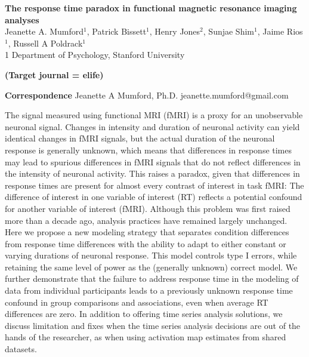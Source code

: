 \documentclass[titlepage,12pt] {article}
\begin{document}
\begin{titlepage}
\begin{center}
{\large\textbf{The response time paradox in functional magnetic resonance imaging analyses
}}\\
{Jeanette A. Mumford$^1$, Patrick Bissett$^1$, Henry Jones$^2$, Sunjae Shim$^1$, Jaime Rios$^1$, Russell A Poldrack$^1$\\
  \small{1} Department of Psychology, Stanford University }
\end{center}


\textbf{(Target journal = elife)}

\vspace{2.8in}
\begin{singlespace}
  \hspace{0.1in}\newline
\textbf{Correspondence}\newline 
Jeanette A Mumford, Ph.D. \newline 
jeanette.mumford@gmail.com \newline
\end{singlespace}

\newpage
{}


The signal measured using functional MRI (fMRI) is a proxy for an unobservable neuronal signal. Changes in intensity and duration of neuronal activity can yield identical changes in fMRI signals, but the actual duration of the neuronal response is generally unknown, which means that differences in response times may lead to spurious differences in fMRI signals that do not reflect differences in the intensity of neuronal activity.  This raises a paradox, given that differences in response times are present for almost every contrast of interest in task fMRI: The difference of interest in one variable of interest (RT) reflects a potential confound for another variable of interest (fMRI).  Although this problem was first raised more than a decade ago, analysis practices have remained largely unchanged.  Here we propose a new modeling strategy that separates condition differences from response time differences with the ability to adapt to either constant or varying durations of neuronal response.  This model controls type I errors, while retaining the same level of power as the (generally unknown) correct model.  We further demonstrate that the failure to address response time in the modeling of data from individual participants leads to a previously unknown response time confound in group comparisons and associations, even when average RT differences are zero.  In addition to offering time series analysis solutions, we discuss limitation and fixes when the time series analysis decisions are out of the hands of the researcher, as when using activation map estimates from shared datasets.


\vspace{.1in}


\end{titlepage}
\end{document}
